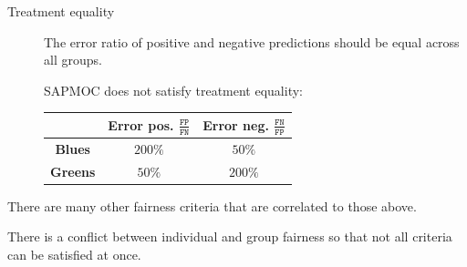 \begin{description}
\begin{description}
            \item[Treatment equality] 
                The error ratio of positive and negative predictions should be equal across all groups.
                \begin{example}[SAPMOC]
                    SAPMOC does not satisfy treatment equality:
                    \begin{center}
                        \footnotesize
                        \begin{tabular}{c|cc}
                            \toprule
                                & \textbf{Error pos.} $\frac{\texttt{FP}}{\texttt{FN}}$ 
                                & \textbf{Error neg.} $\frac{\texttt{FN}}{\texttt{FP}}$ \\
                            \midrule
                                \textbf{Blues} & $200\%$ & $50\%$ \\
                                \textbf{Greens} & $50\%$ & $200\%$ \\
                            \bottomrule
                        \end{tabular}
                    \end{center}
                \end{example}
        \end{description}

        \begin{remark}
            There are many other fairness criteria that are correlated to those above.
        \end{remark}

        \begin{remark}
            There is a conflict between individual and group fairness so that not all criteria can be satisfied at once.
        \end{remark}
\end{description}

